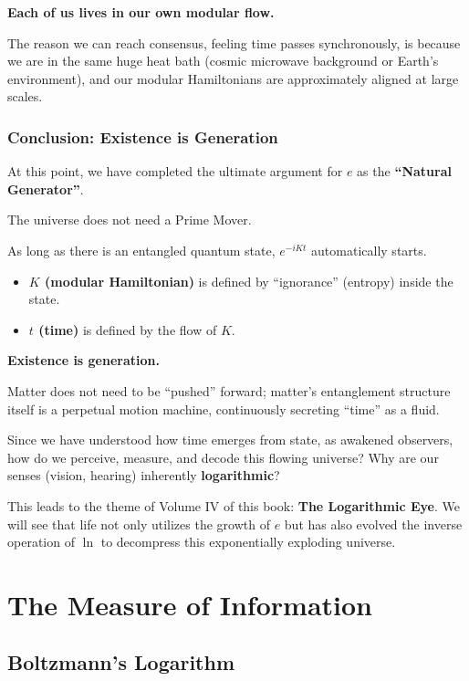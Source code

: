\documentclass[11pt,a4paper,twoside]{book}
\begin{document}
\textbf{Each of us lives in our own modular flow.}

The reason we can reach consensus, feeling time passes synchronously, is because we are in the same huge heat bath (cosmic microwave background or Earth's environment), and our modular Hamiltonians are approximately aligned at large scales.

\subsection{Conclusion: Existence is Generation}

At this point, we have completed the ultimate argument for \textbf{$e$} as the \textbf{``Natural Generator''}.

The universe does not need a Prime Mover.

As long as there is an entangled quantum state, \textbf{$e^{-iKt}$} automatically starts.

\begin{itemize}
\item \textbf{$K$ (modular Hamiltonian)} is defined by ``ignorance'' (entropy) inside the state.

\item \textbf{$t$ (time)} is defined by the flow of $K$.
\end{itemize}

\textbf{Existence is generation.}

Matter does not need to be ``pushed'' forward; matter's entanglement structure itself is a perpetual motion machine, continuously secreting ``time'' as a fluid.

Since we have understood how time emerges from state, as awakened observers, how do we perceive, measure, and decode this flowing universe? Why are our senses (vision, hearing) inherently \textbf{logarithmic}?

This leads to the theme of Volume IV of this book: \textbf{The Logarithmic Eye}. We will see that life not only utilizes the growth of $e$ but has also evolved the inverse operation of $\ln$ to decompress this exponentially exploding universe.

 
\chapter{The Measure of Information}
\section{Boltzmann's Logarithm}
\end{document}
